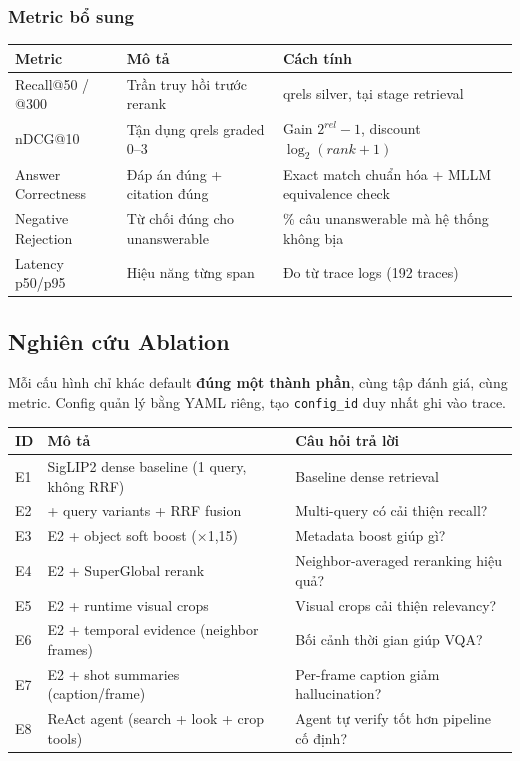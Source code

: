 \documentclass[12pt,a4paper,onecolumn]{article}
\begin{document}
\subsubsection{Metric bổ sung}

\noindent
\begin{tabularx}{\textwidth}{l Y Y}
\toprule
Metric & Mô tả & Cách tính \\
\midrule
Recall@50 / @300 & Trần truy hồi trước rerank & qrels silver, tại stage retrieval \\
nDCG@10 & Tận dụng qrels graded 0–3 & Gain $2^{rel} - 1$, discount $\log_2(rank+1)$ \\
Answer Correctness & Đáp án đúng + citation đúng & Exact match chuẩn hóa + MLLM equivalence check \\
Negative Rejection & Từ chối đúng cho unanswerable & \% câu unanswerable mà hệ thống không bịa \\
Latency p50/p95 & Hiệu năng từng span & Đo từ trace logs (192 traces) \\
\bottomrule
\end{tabularx}


\subsection{Nghiên cứu Ablation}

Mỗi cấu hình chỉ khác default \textbf{đúng một thành phần}, cùng tập đánh giá, cùng metric. Config quản lý bằng YAML riêng, tạo \texttt{config\_id} duy nhất ghi vào trace.

\noindent
\begin{tabularx}{\textwidth}{l Y Y}
\toprule
ID & Mô tả & Câu hỏi trả lời \\
\midrule
E1 & SigLIP2 dense baseline (1 query, không RRF) & Baseline dense retrieval \\
E2 & + query variants + RRF fusion & Multi-query có cải thiện recall? \\
E3 & E2 + object soft boost (×1,15) & Metadata boost giúp gì? \\
E4 & E2 + SuperGlobal rerank & Neighbor-averaged reranking hiệu quả? \\
E5 & E2 + runtime visual crops & Visual crops cải thiện relevancy? \\
E6 & E2 + temporal evidence (neighbor frames) & Bối cảnh thời gian giúp VQA? \\
E7 & E2 + shot summaries (caption/frame) & Per-frame caption giảm hallucination? \\
E8 & ReAct agent (search + look + crop tools) & Agent tự verify tốt hơn pipeline cố định? \\
\bottomrule
\end{tabularx}
\end{document}

